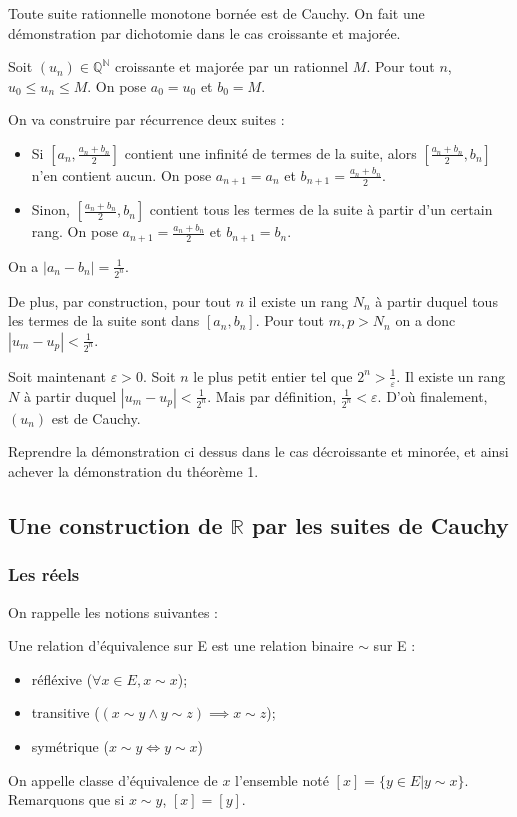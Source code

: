 \begin{theoreme}
Toute suite rationnelle monotone bornée est de Cauchy.
\tcblower
On fait une démonstration par dichotomie dans le cas croissante et majorée.

Soit $(u_n) \in \mathbb{Q}^{\mathbb{N}}$ croissante et majorée par un rationnel $M$. Pour tout $n$, $u_0\leq u_n \leq M$. On pose $a_0=u_0$ et $b_0=M$.

On va construire par récurrence deux suites :
\begin{itemize}
    \item Si $[a_n, \frac{a_n+b_n}{2}]$ contient une infinité de termes de la suite, alors $[\frac{a_n+b_n}{2}, b_n]$ n'en contient aucun. On pose $a_{n+1}=a_n$ et $b_{n+1}=\frac{a_n+b_n}{2}$.
    \item Sinon, $[\frac{a_n+b_n}{2}, b_n]$ contient tous les termes de la suite à partir d'un certain rang. On pose $a_{n+1}=\frac{a_n+b_n}{2}$ et $b_{n+1}=b_n$.
\end{itemize}

On a $|a_n-b_n| = \frac{1}{2^n}$.

De plus, par construction, pour tout $n$ il existe un rang $N_n$ à partir duquel tous les termes de la suite sont dans $[a_n, b_n]$. Pour tout $m,p > N_n$ on a donc $|u_m-u_p|<\frac{1}{2^n}$.

Soit maintenant $\varepsilon > 0$. Soit $n$ le plus petit entier tel que $2^n>\frac{1}{\varepsilon}$. Il existe un rang $N$ à partir duquel $|u_m-u_p|<\frac{1}{2^n}$. Mais par définition, $\frac{1}{2^n}<\varepsilon$. D'où finalement, $(u_n)$ est de Cauchy.
\end{theoreme}
\begin{exo}
    Reprendre la démonstration ci dessus dans le cas décroissante et minorée, et ainsi achever la démonstration du théorème 1.
\end{exo}

\subsection{Une construction de $\mathbb{R}$ par les suites de Cauchy}
\subsubsection{Les réels}
On rappelle les notions suivantes :
\begin{defini}
Une relation d'équivalence sur E est une relation binaire $\sim$ sur E :
\begin{itemize}
\item réfléxive ($\forall x\in E, x\sim x$);
\item transitive ($(x\sim y \land y\sim z) \implies x\sim z$);
\item symétrique ($x\sim y \iff y\sim x$)
\end{itemize}

On appelle classe d'équivalence de $x$ l'ensemble noté $[x]=\{y\in E|y\sim x\}$. Remarquons que si $x\sim y$, $[x]=[y]$.
\end{defini}

